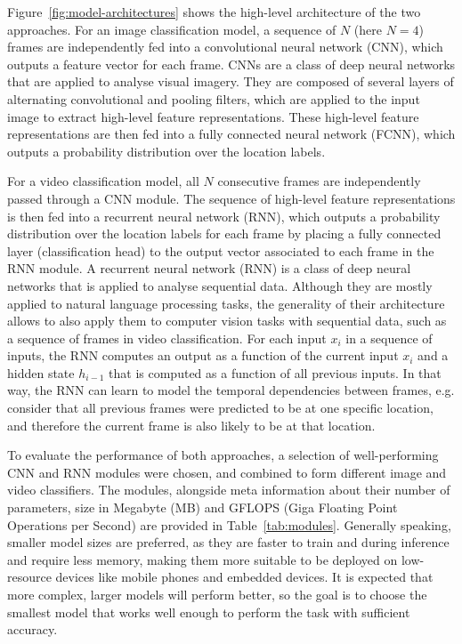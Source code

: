 \documentclass[a4paper]{article}
\begin{document}
  Figure~\ref{fig:model-architectures} shows the high-level architecture of the two
  approaches. For an image classification model, a sequence of $N$ (here $N=4$)
  frames are independently fed into a convolutional neural network (CNN), which
  outputs a feature vector for each frame. CNNs are a class of deep neural
  networks that are applied to analyse visual imagery. They are composed of
  several layers of alternating convolutional and pooling filters, which are
  applied to the input image to extract high-level feature representations.
  These high-level feature representations are then fed into a fully connected
  neural network (FCNN), which outputs a probability distribution over the
  location labels.

  For a video classification model, all $N$ consecutive frames are independently
  passed through a CNN module. The sequence of high-level feature
  representations is then fed into a recurrent neural network (RNN), which
  outputs a probability distribution over the location labels for each frame by
  placing a fully connected layer (classification head) to the output vector
  associated to each frame in the RNN module. A recurrent neural network (RNN)
  is a class of deep neural networks that is applied to analyse sequential data.
  Although they are mostly applied to natural language processing tasks, the
  generality of their architecture allows to also apply them to computer vision
  tasks with sequential data, such as a sequence of frames in video
  classification. For each input $x_i$ in a sequence of inputs, the RNN computes
  an output as a function of the current input $x_i$ and a hidden state
  $h_{i-1}$ that is computed as a function of all previous inputs. In that way,
  the RNN can learn to model the temporal dependencies between frames, e.g.
  consider that all previous frames were predicted to be at one specific
  location, and therefore the current frame is also likely to be at that
  location.

  To evaluate the performance of both approaches, a selection of well-performing
  CNN and RNN modules were chosen, and combined to form different image and
  video classifiers. The modules, alongside meta information about their number
  of parameters, size in Megabyte (MB) and GFLOPS (Giga Floating Point
  Operations per Second) are provided in Table~\ref{tab:modules}. Generally
  speaking, smaller model sizes are preferred, as they are faster to train and
  during inference and require less memory, making them more suitable to be
  deployed on low-resource devices like mobile phones and embedded devices. It
  is expected that more complex, larger models will perform better, so the goal
  is to choose the smallest model that works well enough to perform the task
  with sufficient accuracy.
\end{document}
